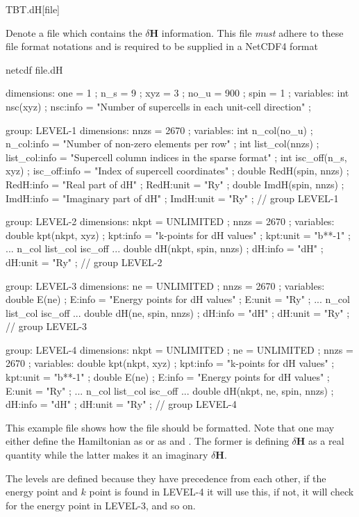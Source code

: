 \begin{fdfentry}{TBT.dH}[file]

  Denote a file which contains the $\delta\mathbf H$ information. This
  file \emph{must} adhere to these file format notations and is
  required to be supplied in a NetCDF4 format

  \begin{shellexample}
netcdf file.dH {
dimensions:
	one = 1 ;
	n_s = 9 ;
	xyz = 3 ;
	no_u = 900 ;
	spin = 1 ;
variables:
	int nsc(xyz) ;
		nsc:info = "Number of supercells in each unit-cell direction" ;

group: LEVEL-1 {
  dimensions:
  	nnzs = 2670 ;
  variables:
  	int n_col(no_u) ;
  		n_col:info = "Number of non-zero elements per row" ;
  	int list_col(nnzs) ;
  		list_col:info = "Supercell column indices in the sparse format" ;
  	int isc_off(n_s, xyz) ;
  		isc_off:info = "Index of supercell coordinates" ;
  	double RedH(spin, nnzs) ;
  		RedH:info = "Real part of dH" ;
  		RedH:unit = "Ry" ;
  	double ImdH(spin, nnzs) ;
  		ImdH:info = "Imaginary part of dH" ;
  		ImdH:unit = "Ry" ;
  } // group LEVEL-1

group: LEVEL-2 {
  dimensions:
  	nkpt = UNLIMITED ;
  	nnzs = 2670 ;
  variables:
  	double kpt(nkpt, xyz) ;
  		kpt:info = "k-points for dH values" ;
  		kpt:unit = "b**-1" ;
  	... n_col list_col isc_off ...
  	double dH(nkpt, spin, nnzs) ;
  		dH:info = "dH" ;
  		dH:unit = "Ry" ;
  } // group LEVEL-2

group: LEVEL-3 {
  dimensions:
  	ne = UNLIMITED ;
  	nnzs = 2670 ;
  variables:
  	double E(ne) ;
  		E:info = "Energy points for dH values" ;
  		E:unit = "Ry" ;
  	... n_col list_col isc_off ...
  	double dH(ne, spin, nnzs) ;
  		dH:info = "dH" ;
  		dH:unit = "Ry" ;
  } // group LEVEL-3

group: LEVEL-4 {
  dimensions:
  	nkpt = UNLIMITED ;
  	ne = UNLIMITED ;
  	nnzs = 2670 ;
  variables:
  	double kpt(nkpt, xyz) ;
  		kpt:info = "k-points for dH values" ;
  		kpt:unit = "b**-1" ;
  	double E(ne) ;
  		E:info = "Energy points for dH values" ;
  		E:unit = "Ry" ;
  	... n_col list_col isc_off ...
  	double dH(nkpt, ne, spin, nnzs) ;
  		dH:info = "dH" ;
  		dH:unit = "Ry" ;
  } // group LEVEL-4
}
  \end{shellexample}

  This example file shows how the file should be formatted. Note that
  one may either define the Hamiltonian as  or as
   and . The former is defining $\delta\mathbf
  H$ as a real quantity while the latter makes it an imaginary
  $\delta\mathbf H$.

  The levels are defined because they have precedence from each other,
  if the energy point and $k$ point is found in LEVEL-4 it will use
  this, if not, it will check for the energy point in LEVEL-3, and so
  on. 

\end{fdfentry}

